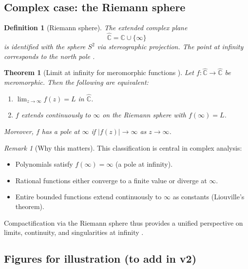 \documentclass[12pt]{article}
\newtheorem{definition}{Definition}
\newtheorem{theorem}{Theorem}
\theoremstyle{remark}
\newtheorem*{remark}{Remark}
\begin{document}
\subsection{Complex case: the Riemann sphere}

\begin{definition}[Riemann sphere]
The extended complex plane 
\[
\hat{\mathbb{C}} = \mathbb{C}\cup\{\infty\}
\]
is identified with the sphere $S^2$ via stereographic projection. The point at 
infinity corresponds to the north pole \citep{Needham1997,AhlforsComplex}.
\end{definition}

\begin{theorem}[Limit at infinity for meromorphic functions {\citep{AhlforsComplex,RudinRealComplex}}]\label{thm:riemann-meromorphic}
Let $f:\hat{\mathbb{C}}\to\hat{\mathbb{C}}$ be meromorphic. Then the following 
are equivalent:
\begin{enumerate}
    \item $\lim_{z\to\infty} f(z)=L$ in $\hat{\mathbb{C}}$.
    \item $f$ extends continuously to $\infty$ on the Riemann sphere with 
    $f(\infty)=L$.
\end{enumerate}
Moreover, $f$ has a pole at $\infty$ if $|f(z)|\to\infty$ as $z\to\infty$.
\end{theorem}

\begin{remark}[Why this matters]
This classification is central in complex analysis:
\begin{itemize}
    \item Polynomials satisfy $f(\infty)=\infty$ (a pole at infinity).
    \item Rational functions either converge to a finite value or diverge at $\infty$.
    \item Entire bounded functions extend continuously to $\infty$ as constants 
    (Liouville’s theorem).
\end{itemize}
Compactification via the Riemann sphere thus provides a unified perspective on 
limits, continuity, and singularities at infinity \citep{AhlforsComplex,Needham1997}.
\end{remark}

\subsection{Figures for illustration (to add in v2)}
\end{document}
